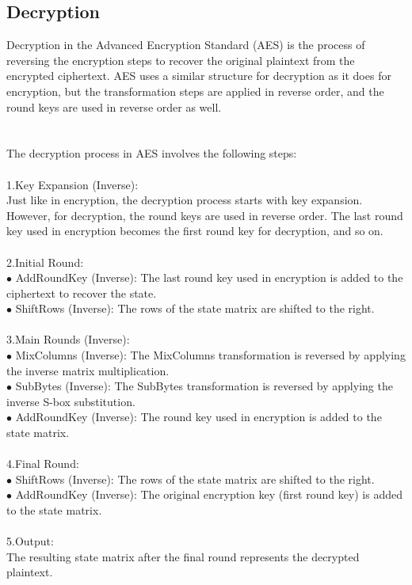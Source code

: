 \documentclass{report}
\begin{document}
\subsection{Decryption}
Decryption in the Advanced Encryption Standard (AES) is the process of reversing the encryption steps to recover the original plaintext from the encrypted ciphertext. AES uses a similar structure for decryption as it does for encryption, but the transformation steps are applied in reverse order, and the round keys are used in reverse order as well.\\
\\
\\
The decryption process in AES involves the following steps:\\
\\
1.Key Expansion (Inverse):\\ Just like in encryption, the decryption process starts with key expansion. However, for decryption, the round keys are used in reverse order. The last round key used in encryption becomes the first round key for decryption, and so on.\\
\\
2.Initial Round:\\
$\bullet$ AddRoundKey (Inverse): The last round key used in encryption is added to the ciphertext to recover the state.\\
$\bullet$ ShiftRows (Inverse): The rows of the state matrix are shifted to the right.\\
\\
3.Main Rounds (Inverse):\\
$\bullet$ MixColumns (Inverse): The MixColumns transformation is reversed by applying the inverse matrix multiplication.\\
$\bullet$ SubBytes (Inverse): The SubBytes transformation is reversed by applying the inverse S-box substitution.\\
$\bullet$ AddRoundKey (Inverse): The round key used in encryption is added to the state matrix.\\
\\
4.Final Round:\\
$\bullet$ ShiftRows (Inverse): The rows of the state matrix are shifted to the right.\\
$\bullet$ AddRoundKey (Inverse): The original encryption key (first round key) is added to the state matrix.\\
\\
5.Output:\\ The resulting state matrix after the final round represents the decrypted plaintext.\\
\end{document}
